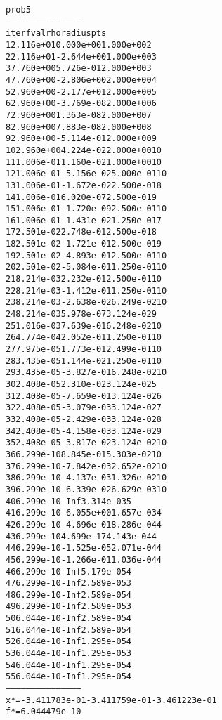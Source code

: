 \begin{alltt}
prob5
---------------------------------------------
iter        fval         rho      radius  pts
   1   2.116e+01   0.000e+00   1.000e+00    2
   2   2.116e+01  -2.644e+00   1.000e+00    3
   3   7.760e+00   5.726e-01   2.000e+00    3
   4   7.760e+00  -2.806e+00   2.000e+00    4
   5   2.960e+00  -2.177e+01   2.000e+00    5
   6   2.960e+00  -3.769e-08   2.000e+00    6
   7   2.960e+00   1.363e-08   2.000e+00    7
   8   2.960e+00   7.883e-08   2.000e+00    8
   9   2.960e+00  -5.114e-01   2.000e+00    9
  10   2.960e+00   4.224e-02   2.000e+00   10
  11   1.006e-01   1.160e-02   1.000e+00   10
  12   1.006e-01  -5.156e-02   5.000e-01   10
  13   1.006e-01  -1.672e-02   2.500e-01    8
  14   1.006e-01   6.020e-07   2.500e-01    9
  15   1.006e-01  -1.720e-09   2.500e-01   10
  16   1.006e-01  -1.431e-02   1.250e-01    7
  17   2.501e-02   2.748e-01   2.500e-01    8
  18   2.501e-02  -1.721e-01   2.500e-01    9
  19   2.501e-02  -4.893e-01   2.500e-01   10
  20   2.501e-02  -5.084e-01   1.250e-01   10
  21   8.214e-03   2.232e-01   2.500e-01   10
  22   8.214e-03  -1.412e-01   1.250e-01   10
  23   8.214e-03  -2.638e-02   6.249e-02   10
  24   8.214e-03   5.978e-07   3.124e-02    9
  25   1.016e-03   7.639e-01   6.248e-02   10
  26   4.774e-04   2.052e-01   1.250e-01   10
  27   7.975e-05   1.773e-01   2.499e-01   10
  28   3.435e-05   1.144e-02   1.250e-01   10
  29   3.435e-05  -3.827e-01   6.248e-02   10
  30   2.408e-05   2.310e-02   3.124e-02    5
  31   2.408e-05  -7.659e-01   3.124e-02    6
  32   2.408e-05  -3.079e-03   3.124e-02    7
  33   2.408e-05  -2.429e-03   3.124e-02    8
  34   2.408e-05  -4.158e-03   3.124e-02    9
  35   2.408e-05  -3.817e-02   3.124e-02   10
  36   6.299e-10   8.845e-01   5.303e-02   10
  37   6.299e-10  -7.842e-03   2.652e-02   10
  38   6.299e-10  -4.137e-03   1.326e-02   10
  39   6.299e-10  -6.339e-02   6.629e-03   10
  40   6.299e-10        -Inf   3.314e-03    5
  41   6.299e-10  -6.055e+00   1.657e-03    4
  42   6.299e-10  -4.696e-01   8.286e-04    4
  43   6.299e-10   4.699e-17   4.143e-04    4
  44   6.299e-10  -1.525e-05   2.071e-04    4
  45   6.299e-10  -1.266e-01   1.036e-04    4
  46   6.299e-10        -Inf   5.179e-05    4
  47   6.299e-10        -Inf   2.589e-05    3
  48   6.299e-10        -Inf   2.589e-05    4
  49   6.299e-10        -Inf   2.589e-05    3
  50   6.044e-10        -Inf   2.589e-05    4
  51   6.044e-10        -Inf   2.589e-05    4
  52   6.044e-10        -Inf   1.295e-05    4
  53   6.044e-10        -Inf   1.295e-05    3
  54   6.044e-10        -Inf   1.295e-05    4
  55   6.044e-10        -Inf   1.295e-05    4
---------------------------------------------
x* = -3.411783e-01  -3.411759e-01  -3.461223e-01  
f* = 6.044479e-10
\end{alltt}
